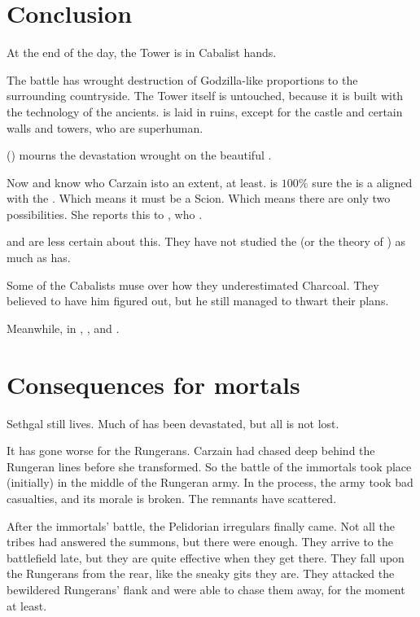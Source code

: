 \section{Conclusion}
At the end of the day, the Tower is in Cabalist hands. 

The battle has wrought destruction of Godzilla-like proportions to the surrounding countryside. The Tower itself is untouched, because it is built with the technology of the ancients. \Forclin{} is laid in ruins, except for the castle and certain walls and towers, who are superhuman. 

\Nzessuacrith{} () mourns the devastation wrought on the beautiful \Forclin. 

Now \Achsah{} and \Nzessuacrith{} know who Carzain is\dash to an extent, at least.
\Achsah{} is $100\%$ sure the \vertex{} is a \sathariah{} aligned with the . 
Which means it must be a Scion. 
Which means there are only two possibilities. 
She reports this to \Azraid, who . 

\Nzessuacrith{} and \Ishnaruchaefir{} are less certain about this. 
They have not studied the \vertex{} (or the theory of \malachim) as much as \Achsah{} has. 

Some of the Cabalists muse over how they underestimated Charcoal. 
They believed to have him figured out, but he still managed to thwart their plans. 

Meanwhile, in \Malcur, , and .





\section{Consequences for mortals}
Sethgal still lives. 
Much of \Forclin has been devastated, but all is not lost. 

It has gone worse for the Rungerans. 
Carzain had chased \Takestsha deep behind the Rungeran lines before she transformed.
So the battle of the immortals took place (initially) in the middle of the Rungeran army. 
In the process, the army took bad casualties, and its morale is broken. 
The remnants have scattered. 

After the immortals' battle, the Pelidorian irregulars finally came. 
Not all the tribes had answered the summons, but there were enough.
They arrive to the battlefield late, but they are quite effective when they get there. 
They fall upon the Rungerans from the rear, like the sneaky gits they are. 
They attacked the bewildered Rungerans' flank and were able to chase them away, for the moment at least.

